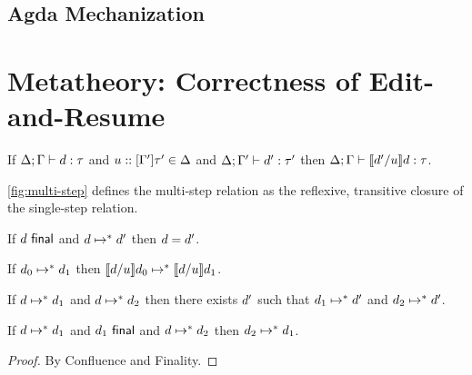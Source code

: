 \subsection{Agda Mechanization}
\label{sec:agda-mechanization}




{\color{gray}\blindtext}


\section{Metatheory: Correctness of Edit-and-Resume}
\label{sec:resumption}




{\color{gray}\blindtext}


\begin{theorem}[Instantiation]
  If $\Delta; \Gamma \vdash d : \tau$
  and $u :: [\Gamma']\tau'\in\Delta$
  and $\Delta; \Gamma' \vdash d' : \tau'$
  then $\Delta; \Gamma \vdash \llbracket d' / u\rrbracket d : \tau$.
\end{theorem}

\autoref{fig:multi-step} defines the multi-step relation as the reflexive,
transitive closure of the single-step relation.

\begin{lemma}[Finality]
  If $d~\mathsf{final}$ and $d \mapsto^* d'$
  then $d=d'$.
\end{lemma}

\begin{theorem}[Commutativity]
  If $d_0 \mapsto^* d_1$
  then $\llbracket d / u\rrbracket d_0 \mapsto^* \llbracket d / u\rrbracket d_1$.
\end{theorem}

\begin{theorem}[Confluence]
  If $d \mapsto^* d_1$
  and $d \mapsto^* d_2$
  then there exists $d'$ such that
  $d_1 \mapsto^* d'$ and
  $d_2 \mapsto^* d'$.
\end{theorem}

\begin{corollary}
  If $d \mapsto^* d_1$
  and $d_1~\mathsf{final}$
  and $d \mapsto^* d_2$
  then $d_2 \mapsto^* d_1$.
  \begin{proof}
    By Confluence and Finality.
  \end{proof}
\end{corollary}

